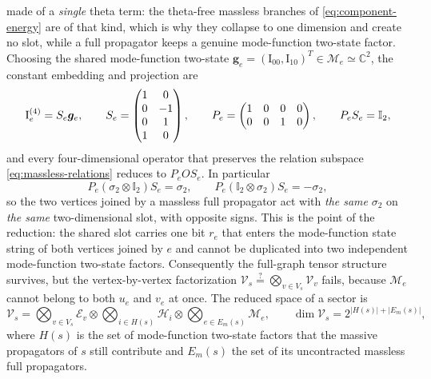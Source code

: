 \documentclass[11pt,a4paper]{article}
\newcommand{\Id}{\mathbb I}
\newcommand{\cV}{\mathcal V}
\newcommand{\cE}{\mathcal E}
\newcommand{\cH}{\mathcal H}
\newcommand{\cM}{\mathcal M}
\begin{document}
made of a \emph{single} theta term: the theta-free massless branches of
\eqref{eq:component-energy} are of that kind, which is why they collapse to one dimension and create
no slot, while a full propagator keeps a genuine mode-function two-state factor. Choosing the shared mode-function two-state
$\bm g_e=(\text{I}_{00},\text{I}_{10})^T\in\cM_e\simeq\mathbb C^2$, the constant embedding and
projection are
\begin{equation}
  \bm{\text I}^{(4)}_e=S_e\bm g_e,\qquad
  S_e=\begin{pmatrix}1&0\\0&-1\\0&1\\1&0\end{pmatrix},\qquad
  P_e=\begin{pmatrix}1&0&0&0\\0&0&1&0\end{pmatrix},\qquad
  P_eS_e=\Id_2,
  \label{eq:SP-massless}
\end{equation}
and every four-dimensional operator that preserves the relation subspace \eqref{eq:massless-relations}
reduces to $P_eOS_e$. In particular
\begin{equation}
  P_e(\sigma_2\otimes\Id_2)S_e=\sigma_2,
  \qquad
  P_e(\Id_2\otimes\sigma_2)S_e=-\sigma_2,
  \label{eq:endpoint-projections}
\end{equation}
so the two vertices joined by a massless full propagator act with \emph{the same} $\sigma_2$ on
\emph{the same} two-dimensional slot, with opposite signs. This is the point of the reduction: the
shared slot carries one bit $r_e$ that enters the mode-function state string of both vertices joined by $e$ and
cannot be duplicated
into two independent mode-function two-state factors. Consequently the full-graph tensor structure survives, but
the vertex-by-vertex factorization
$\cV_s\stackrel{?}{=}\bigotimes_{v\in V_s}\cV_v$ fails, because $\cM_e$ cannot belong to both $u_e$
and $v_e$ at once. The reduced space of a sector is
\begin{equation}
  \cV_s=\bigotimes_{v\in V_s}\cE_v
  \otimes\bigotimes_{i\in H(s)}\cH_i
  \otimes\bigotimes_{e\in E_m(s)}\cM_e,
  \qquad \dim\cV_s=2^{|H(s)|+|E_m(s)|},
  \label{eq:reduced-space}
\end{equation}
where $H(s)$ is the set of mode-function two-state factors that the massive propagators of $s$ still contribute
and $E_m(s)$ the set of its uncontracted massless full propagators.
\end{document}
